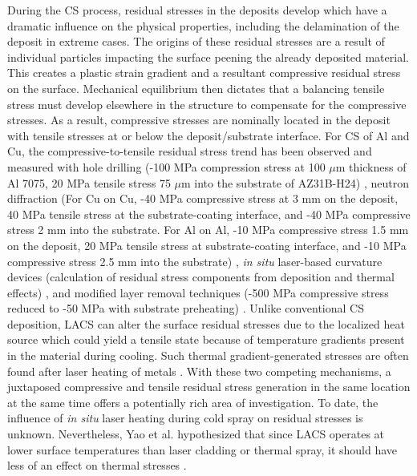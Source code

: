 	During the CS process, residual stresses in the deposits develop which have a dramatic influence on the physical properties, including the delamination of the deposit in extreme cases. The origins of these residual stresses are a result of individual particles impacting the surface peening the already deposited material. This creates a plastic strain gradient and a resultant compressive residual stress on the surface. Mechanical equilibrium then dictates that a balancing tensile stress must develop elsewhere in the structure to compensate for the compressive stresses. As a result, compressive stresses are nominally located in the deposit with tensile stresses at or below the deposit/substrate interface. For CS of Al and Cu, the compressive-to-tensile residual stress trend has been observed and measured with hole drilling (-100 MPa compression stress at 100 $ \mu$m thickness of Al 7075, 20 MPa tensile stress 75 $ \mu$m into the substrate of AZ31B-H24) \cite{RN802}, neutron diffraction (For Cu on Cu, -40 MPa compressive stress at 3 mm on the deposit, 40 MPa tensile stress at the substrate-coating interface, and -40 MPa compressive stress 2 mm into the substrate. For Al on Al, -10 MPa compressive stress 1.5 mm on the deposit, 20 MPa tensile stress at substrate-coating interface, and -10 MPa compressive stress 2.5 mm into the substrate) \cite{RN332,RN2263}, \textit{in situ} laser-based curvature devices (calculation of residual stress components from deposition and thermal effects) \cite{RN857}, and modified layer removal techniques (-500 MPa compressive stress reduced to -50 MPa with substrate preheating) \cite{RN1142}. Unlike conventional CS deposition, LACS can alter the surface residual stresses due to the localized heat source which could yield a tensile state because of temperature gradients present in the material during cooling. Such thermal gradient-generated stresses are often found after laser heating of metals \cite{RN828,RN1396}. With these two competing mechanisms, a juxtaposed compressive and tensile residual stress generation in the same location at the same time offers a potentially rich area of investigation. To date, the influence of \textit{in situ} laser heating during cold spray on residual stresses is unknown. Nevertheless, Yao et al. hypothesized that since LACS operates at lower surface temperatures than laser cladding or thermal spray, it should have less of an effect on thermal stresses \cite{RN1386}. 



